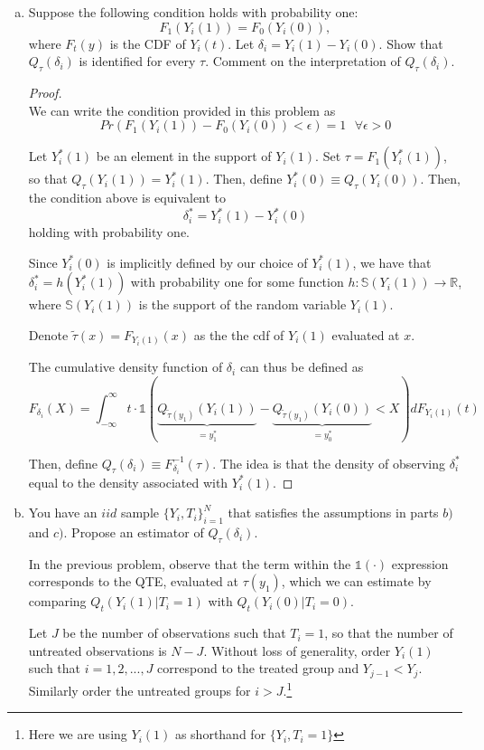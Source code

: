 \documentclass[11pt]{article}
\begin{document}
\begin{enumerate}[a)]
	\item Suppose the following condition holds with probability one:
	$$ F_1(Y_i(1)) = F_0(Y_i(0)),$$
	where $F_t(y)$ is the CDF of $Y_i(t)$. Let $\delta_i = Y_i(1) - Y_i(0)$. Show that $Q_\tau(\delta_i)$ is identified for every $\tau$. Comment on the interpretation of $Q_\tau(\delta_i)$.

	\begin{proof}\mbox{}\\
		We can write the condition provided in this problem as 
		$$Pr(F_1(Y_i(1)) - F_0(Y_i(0)) < \epsilon) = 1 \mbox{ } \forall \epsilon > 0$$

		Let $Y_i^*(1)$ be an element in the support of $Y_i(1)$. Set $\tau = F_1(Y_i^*(1))$, so that $Q_\tau(Y_i(1)) = Y_i^*(1)$. Then, define $Y_i^*(0) \equiv Q_\tau(Y_i(0))$. Then, the condition above is equivalent to $$\delta_i^* = Y_i^*(1) - Y_i^*(0)$$ holding with probability one. 

		Since $Y_i^*(0)$ is implicitly defined by our choice of $Y_i^*(1)$, we have that $\delta_i^* = h(Y_i^*(1))$ with probability one for some function $h:\mathbb{S}(Y_i(1)) \to \mathbb{R}$, where $\mathbb{S}(Y_i(1))$ is the support of the random variable $Y_i(1)$.

		Denote $\tilde \tau(x) = F_{Y_i(1)}(x)$ as the the cdf of $Y_i(1)$ evaluated at $x$. 

		The cumulative density function of $\delta_i$ can thus be defined as
		$$F_{\delta_i}(X) = \int_{-\infty}^{\infty}t \cdot \mathbb{1}(\underbrace{Q_{\tilde \tau(y_1)}(Y_i(1))}_{= y_1^*} - \underbrace{Q_{\tilde \tau(y_1)}(Y_i(0))}_{= y_0^*} < X)dF_{Y_i(1)}(t)$$

		Then, define $Q_\tau(\delta_i) \equiv F_{\delta_i}^{-1}(\tau)$. The idea is that the density of observing $\delta_i^*$ equal to the density associated with $Y_i^*(1)$.
	\end{proof}
	
	\item You have an $iid$ sample $\{Y_i,T_i\}_{i=1}^{N}$ that satisfies the assumptions in parts $b)$ and $c)$. Propose an estimator of $Q_\tau(\delta_i)$.

	In the previous problem, observe that the term within the $\mathbb{1}(\cdot)$ expression corresponds to the QTE, evaluated at $\tau(y_1)$, which we can estimate by comparing $Q_t(Y_i(1)|T_i = 1)$ with $Q_t(Y_i(0)|T_i = 0)$. 

	Let $J$ be the number of observations such that $T_i = 1$, so that the number of untreated observations is $N - J$. Without loss of generality, order $Y_i(1)$ such that $i = 1,2,...,J$ correspond to the treated group and $Y_{j-1} < Y_{j}$. Similarly order the untreated groups for $i > J$.\footnote{Here we are using $Y_i(1)$ as shorthand for $\{ Y_i,T_i = 1\}$}


\end{enumerate}
\end{document}
